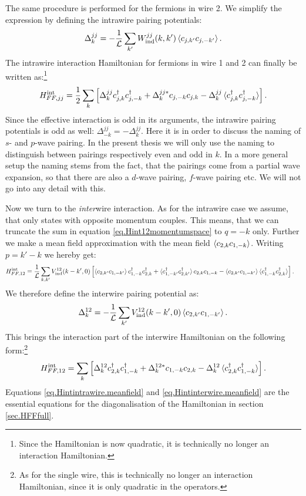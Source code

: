 The same procedure is performed for the fermions in wire 2. We simplify the expression by defining the intrawire pairing potentials:
\begin{equation}
\Delta^{jj}_k = -\frac{1}{\mathcal{L}}\sum_{k'}W^{jj}_{\text{ind}}(k,k')\braket {c_{j, k'}c_{j, -k'}}.
\label{eq.intrawirepairingpotentialdef}
\end{equation}
The intrawire interaction Hamiltonian for fermions in wire 1 and 2 can finally be written as:\footnote{Since the Hamiltonian is now quadratic, it is technically no longer an interaction Hamiltonian.}
\begin{equation}
H^\text{int}_{FF,jj} = \frac{1}{2}\sum_k \left[\Delta^{jj}_k c^\dagger_{j,k}c^\dagger_{j,-k} + \Delta^{jj *}_k c_{j,-k}c_{j,k} - \Delta^{jj}_k\braket{c^\dagger_{j,k}c^\dagger_{j,-k}} \right].
\label{eq.Hintintrawire.meanfield}
\end{equation}
Since the effective interaction is odd in its arguments, the intrawire pairing potentials is odd as well: $\Delta^{jj}_{-k} = -\Delta^{jj}_k$. Here it is in order to discuss the naming of $s$- and $p$-wave pairing. In the present thesis we will only use the naming to distinguish between pairings respectively even and odd in $k$. In a more general setup the naming stems from the fact, that the pairings come from a partial wave expansion, so that there are also a $d$-wave pairing, $f$-wave pairing etc. We will not go into any detail with this.

Now we turn to the \textit{inter}wire interaction. As for the intrawire case we assume, that only states with opposite momentum couples. This means, that we can truncate the sum in equation \eqref{eq.Hint12momentumspace} to $q = -k$ only. Further we make a mean field approximation with the mean field $\braket{c_{2,k}c_{1,-k}}$. Writing $p = k' - k$ we hereby get:
\begin{align}
H^\text{int}_{FF,12} = \frac{1}{\mathcal{L}} \sum_{k,k'} V_{\text{ind}}^{12}(k - k',0) & \left[\braket{c_{2,k'}c_{1,-k'}}c^\dagger_{1,-k}c^\dagger_{2,k} + \braket{c^\dagger_{1,-k'}c^\dagger_{2,k'}}c_{2,k}c_{1,-k} - \braket{c_{2,k'}c_{1,-k'}}\braket{c^\dagger_{1,-k}c^\dagger_{2,k}} \right]. \nonumber
\end{align}
We therefore define the interwire pairing potential as:
\begin{equation}
\Delta^{12}_k = -\frac{1}{\mathcal{L}} \sum_{k'} V_{\text{ind}}^{12}(k - k',0)\braket{c_{2,k'}c_{1,-k'}}.
\label{eq.interwirepairingpotentialdef}
\end{equation}
This brings the interaction part of the interwire Hamiltonian on the following form:\footnote{As for the single wire, this is technically no longer an interaction Hamiltonian, since it is only quadratic in the operators.}
\begin{equation}
H^\text{int}_{FF,12} = \sum_{k} \left[\Delta^{12}_k c^\dagger_{2,k}c^\dagger_{1,-k} + \Delta^{12 *}_k c_{1,-k}c_{2,k} - \Delta^{12}_k\braket{c^\dagger_{2,k}c^\dagger_{1,-k}} \right].
\label{eq.Hintinterwire.meanfield}
\end{equation}
Equations \ref{eq.Hintintrawire.meanfield} and \ref{eq.Hintinterwire.meanfield} are the essential equations for the diagonalisation of the Hamiltonian in section \ref{sec.HFFfull}. 

